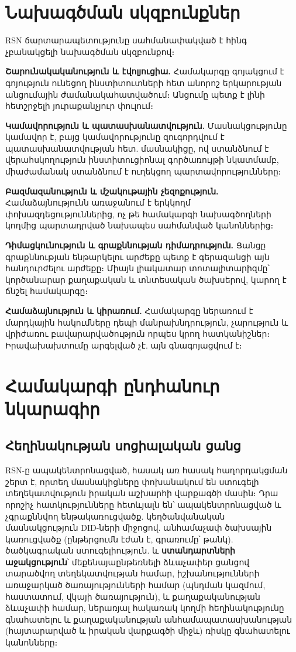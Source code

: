 \documentclass[11pt,a4paper,twocolumn]{article}
\begin{document}
\section{Նախագծման սկզբունքներ}

RSN ճարտարապետությունը սահմանափակված է հինգ չբանակցելի նախագծման սկզբունքով։

\textbf{Շարունակականություն և էվոլյուցիա.} Համակարգը գոյակցում է գոյություն ունեցող ինստիտուտների հետ անորոշ երկարության անցումային ժամանակահատվածում։ Անցումը պետք է լինի հետշրջելի յուրաքանչյուր փուլում։

\textbf{Կամավորություն և պատասխանատվություն.} Մասնակցությունը կամավոր է, բայց կամավորությունը զուգորդվում է պատասխանատվության հետ. մասնակիցը, ով ստանձնում է վերահսկողություն ինստիտուցիոնալ գործառույթի նկատմամբ, միաժամանակ ստանձնում է ուղեկցող պարտավորությունները։

\textbf{Բազմազանություն և մշակութային չեզոքություն.} Համաձայնությունն առաջանում է երկկողմ փոխազդեցություններից, ոչ թե համակարգի նախագծողների կողմից պարտադրված նախապես սահմանված կանոններից։

\textbf{Դիմացկունություն և գրաքննության դիմադրություն.} Ցանցը գրաքննության ենթարկելու արժեքը պետք է գերազանցի այն հանդուրժելու արժեքը։ Միայն լիակատար տոտալիտարիզմը՝ կործանարար քաղաքական և տնտեսական ծախսերով, կարող է ճնշել համակարգը։

\textbf{Համաձայնություն և կիրառում.} Համակարգը ներառում է մարդկային հակումները դեպի մանրախնդրություն, չարություն և վրիժառու բավարարվածություն որպես կրող հատկանիշներ։ Իրավախախտումը արգելված չէ. այն գնագոյացվում է։

\section{Համակարգի ընդհանուր նկարագիր}

\subsection{Հեղինակության սոցիալական ցանց}

RSN-ը ապակենտրոնացված, հասակ առ հասակ հաղորդակցման շերտ է, որտեղ մասնակիցները փոխանակում են ստուգելի տեղեկատվություն իրական աշխարհի վարքագծի մասին։ Դրա որոշիչ հատկությունները հետևյալն են՝ ապակենտրոնացված և չգրաքննվող ենթակառուցվածք. կեղծանվանական մասնակցություն DID-ների միջոցով. անհամաչափ ծախսային կառուցվածք (ընթերցումն էժան է, գրառումը՝ թանկ). ծածկագրական ստուգելիություն. և \textbf{ստանդարտների աջակցություն}՝ մեքենայաընթեռնելի ձևաչափեր ցանցով տարածվող տեղեկատվության համար, իշխանությունների առաջարկած ծառայությունների համար (պնդման կազմում, հաստատում, վկայի ծառայություն), և քաղաքականության ձևաչափի համար, ներառյալ հակառակ կողմի հեղինակությունը գնահատելու և քաղաքականության անհամապատասխանության (հայտարարված և իրական վարքագծի միջև) ռիսկը գնահատելու կանոնները։
\end{document}
